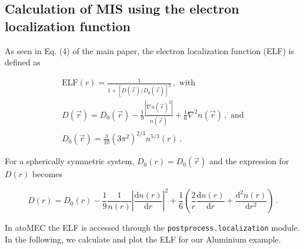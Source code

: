 \documentclass[9pt]{article}
\begin{document}
    \hypertarget{calculation-of-mis-using-the-electron-localization-function}{%
\subsection{Calculation of MIS using the electron localization
function}\label{calculation-of-mis-using-the-electron-localization-function}}

As seen in Eq. (4) of the main paper, the electron localization function
(ELF) is defined as

\begin{gather}
\textrm{ELF}(r) = \frac{1}{1+[D(\vec{r})/D_0(\vec{r})]^2}\,,\textrm{ with} \\
D(\vec{r}) = D_0(\vec{r}) - \frac{1}{9} \frac{|\nabla n(\vec{r})^2|}{n(\vec{r})} + \frac{1}{6}\nabla^2 n(\vec{r})\,, \textrm{ and} \\
D_0(\vec{r}) = \frac{3}{10}(3\pi^2)^{2/3} n^{5/3}(r)\,.
\end{gather}

For a spherically symmetric system, \(D_0(r)=D_0(\vec{r})\) and the
expression for \(D(r)\) becomes

\begin{equation}
D(r) = D_0(r) - \frac{1}{9} \frac{1}{n(r)} \left| \frac{\textrm{d}n(r)}{\textrm{d}r}\right|^2 + \frac{1}{6} \left(  \frac{2}{r} \frac{\textrm{d}n(r)}{\textrm{d}r} +  \frac{\textrm{d}^2 n(r)}{\textrm{d}r^2}\right)\,.
\end{equation}

In atoMEC the ELF is accessed through the
\texttt{postprocess.localization} module. In the following, we calculate
and plot the ELF for our Aluminium example.
\end{document}
